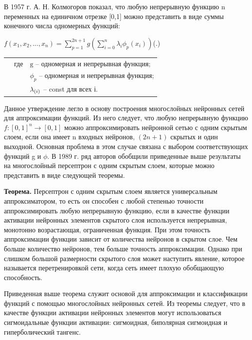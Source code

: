 {	\par \redline В 1957 г. А. Н. Колмогоров показал, что любую непрерывную функцию \textrm{n} переменных на единичном отрезке \textrm{[0,1]} можно представить в виде суммы конечного числа одномерных функций: 
	
	\formulaspace \par \redline 
	$\mathit{f}(x_1,x_2,\dots,x_n) = \sum \limits _{p=1}^{2n+1} g( \sum \limits _{i=0}^{n} \lambda_{i} \phi_{p}(x_{i}))$\hfill (\thechaptercntr .\theformulacntr) \redline
	\formulaspace \addtocounter{formulacntr}{1}
	 
	
	\begin{tabular}{p{}p{}p{}}
		& где  & $\textrm{g}$ {--} одномерная и непрерывная функция; \\
		&      & $\phi_{p}$ {--} одномерная и непрерывная функция; \\
		&      & $\lambda_{\textrm(i)}$ {--} const для всех і. \\
		\end{tabular}
	
	\par \redline Данное утверждение легло в основу построения многослойных нейронных сетей для аппроксимации функций. Из него следует, что любую непрерывную функцию $\mathit{f}:[0,1]^{n} \rightarrow [0,1] $  можно аппроксимировать нейронной сетью с одним скрытым слоем, если она имеет n входных нейронов, $(2n + 1)$ скрытых и один выходной. Основная проблема в этом случае связана с выбором соответствующих функций g и $\phi$. В 1989 г. ряд авторов обобщили приведенные выше результаты на многослойный персептрон с одним скрытым слоем, которые можно представить в виде следующей теоремы.
	
	\par \redline \textbf{Теорема.} Персептрон с одним скрытым слоем является универсальным аппроксиматором, то есть он способен с любой степенью точности аппроксимировать любую непрерывную функцию, если в качестве функции активации нейронных элементов скрытого слоя используется непрерывная, монотонно возрастающая, ограниченная функция. При этом точность аппроксимации функции зависит от количества нейронов в скрытом слое. Чем больше количество нейронов, тем больше точность аппроксимации. Однако при слишком большой размерности скрытого слоя может наступить явление, которое называется перетренировкой сети, когда сеть имеет плохую обобщающую способность.
	
	\par \redline Приведенная выше теорема служит основой для аппроксимации и классификации функций с помощью многослойных нейронных сетей. Из теоремы следует, что в качестве функции активации нейронных элементов могут использоваться сигмоидальные функции активации: сигмоидная, биполярная сигмоидная и гиперболический тангенс.
	
}
